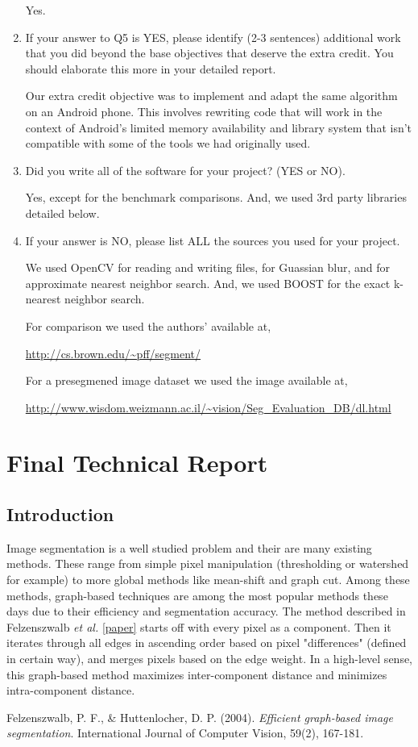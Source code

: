 \documentclass[12pt, english, titlepage]{article}
\begin{document}
\begin{enumerate}
Yes.

\item If your answer to Q5 is YES, please identify (2-3 sentences) additional work that you did beyond the base objectives that deserve the extra credit. You should elaborate this more in your detailed report.

Our extra credit objective was to implement and adapt the same algorithm on an Android phone. This involves rewriting code that will work in the context of Android's limited memory availability and library system that isn't compatible with some of the tools we had originally used.

\item Did you write all of the software for your project? (YES or NO).

Yes, except for the benchmark comparisons. And, we used 3rd party libraries detailed below.

\item If your answer is NO, please list ALL the sources you used for your project.

We used OpenCV for reading and writing files, for Guassian blur, and for approximate nearest neighbor search. And, we used BOOST for the exact k-nearest neighbor search.

For comparison we used the authors' available at,

\url{http://cs.brown.edu/~pff/segment/}

For a presegmened image dataset we used the image available at,

\url{http://www.wisdom.weizmann.ac.il/~vision/Seg_Evaluation_DB/dl.html}

\end{enumerate}


\section{Final Technical Report}

\subsection{Introduction}

Image segmentation is a well studied problem and their are many existing methods. These range from simple pixel manipulation (thresholding or watershed for example) to more global methods like mean-shift and graph cut.
	Among these methods, graph-based techniques are among the most popular methods these days due to their efficiency and segmentation accuracy. The method described in Felzenszwalb \emph{et al.} \ref{paper} starts off with every pixel as a component. Then it iterates through all edges in ascending order based on pixel "differences" (defined in certain way), and merges pixels based on the edge weight. In a high-level sense, this graph-based method maximizes inter-component distance and minimizes intra-component distance.



\begin{thebibliography}{2}
\small

Felzenszwalb, P. F., \& Huttenlocher, D. P. (2004).
	\emph{Efficient graph-based image segmentation}.
	International Journal of Computer Vision, 59(2), 167-181.

\end{thebibliography}
\end{document}
